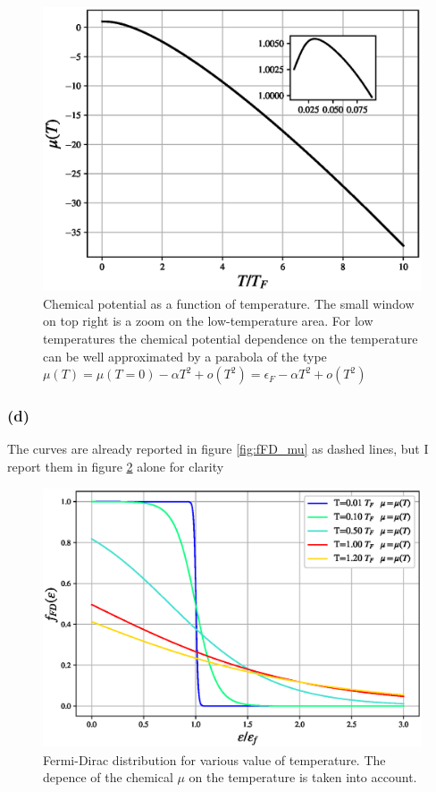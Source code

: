 \documentclass{article}
\begin{document}
\begin{figure}[hbtp]
    \centering 
    \includegraphics[scale=0.7]{scripts/mu_T.eps}
    \caption{Chemical potential as a function of temperature. The small window on top right is a zoom on the low-temperature area. For low temperatures
    the chemical potential dependence on the temperature can be well approximated by a parabola of the type $\mu(T) = \mu(T=0) - \alpha T^2 + o(T^2) = \epsilon_F - \alpha T^2 + o(T^2)$}
    \label{fig:chemical_potential}
\end{figure}

\subsubsection*{(d)}
The curves are already reported in figure \ref{fig:fFD_mu} as dashed lines, but I report them in figure \ref{fig:fFD_mu_T} alone for clarity
\begin{figure}[htbpb]
    \centering
    \includegraphics[scale=0.5]{scripts/f_fd_mu_T.eps}
    \caption{Fermi-Dirac distribution for various value of temperature. The depence of the chemical $\mu$ on the temperature is taken into account.}
    \label{fig:fFD_mu_T}
\end{figure}
\end{document}
